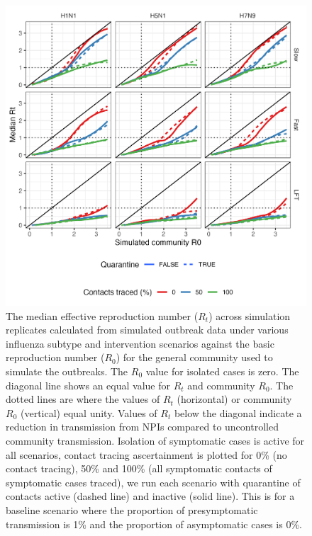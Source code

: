 \documentclass{article}
\begin{document}
\begin{figure}[ht]
\centering
\includegraphics[width=\textwidth]{../plots/r0_low_presym_asym.png}
\caption{The median effective reproduction number ($R_t$) across simulation replicates calculated from simulated outbreak data under various influenza subtype and intervention scenarios against the basic reproduction number ($R_0$) for the general community used to simulate the outbreaks. The $R_0$ value for isolated cases is zero. The diagonal line shows an equal value for $R_t$ and community $R_0$. The dotted lines are where the values of $R_t$ (horizontal) or community $R_0$ (vertical) equal unity. Values of $R_t$ below the diagonal indicate a reduction in transmission from NPIs compared to uncontrolled community transmission. Isolation of symptomatic cases is active for all scenarios, contact tracing ascertainment is plotted for 0\% (no contact tracing), 50\% and 100\% (all symptomatic contacts of symptomatic cases traced), we run each scenario with quarantine of contacts active (dashed line) and inactive (solid line). This is for a baseline scenario where the proportion of presymptomatic transmission is 1\% and the proportion of asymptomatic cases is 0\%.}
\label{fig:r0_low_presym_asym}
\end{figure}

\clearpage
\end{document}
